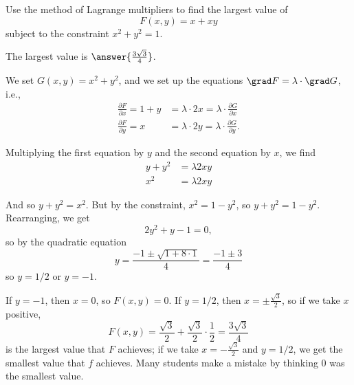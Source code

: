 \documentclass{ximera}
\author{Jim Fowler}
\begin{document}
\begin{exercise}
  Use the method of Lagrange multipliers to find the largest value of 
$$
F(x,y) = x + xy
$$
subject to the constraint $x^2 + y^2 = 1$.

The largest value is $\answer{\frac{3 \sqrt{3}}{4}}$.

\begin{hint}
We set $G(x,y) = x^2 + y^2$, and we set up the equations $\grad F = \lambda \cdot \grad G$, i.e.,
\begin{align*}
\frac{\partial F}{\partial x} = 1 + y &= \lambda \cdot 2x = \lambda \cdot \frac{\partial G}{\partial x}\\
\frac{\partial F}{\partial y} = x &= \lambda \cdot 2y = \lambda \cdot \frac{\partial G}{\partial y
}.
\end{align*}
\end{hint}

\begin{hint}
Multiplying the first equation by $y$ and the second equation by $x$, we find
\begin{align*}
y + y^2 &= \lambda 2xy \\
x^2 &= \lambda 2xy
\end{align*}
\end{hint}

\begin{hint}
And so $y + y^2 = x^2$.  But by the constraint, $x^2 = 1 - y^2$, so $y + y^2 = 1 - y^2$.  Rearranging, we get
$$
2 y^2 + y - 1 = 0,
$$
so by the quadratic equation
$$
y = \frac{-1 \pm \sqrt{1 + 8 \cdot 1}}{4} = \frac{-1 \pm 3}{4}
$$
so $y = 1/2$ or $y = -1$.
\end{hint}

\begin{hint}
If $y = -1$, then $x = 0$, so $F(x,y) = 0$.  If $y = 1/2$, then $x = \pm \frac{\sqrt{3}}{2}$, so if we take $x$ positive,
$$
F(x,y) = \frac{\sqrt{3}}{2} + \frac{\sqrt{3}}{2} \cdot \frac{1}{2} = \frac{3 \sqrt{3}}{4}
$$
is the largest value that $F$ achieves; if we take $x =
-\frac{\sqrt{3}}{2}$ and $y = 1/2$, we get the smallest value that $f$
achieves.  Many students make a mistake by thinking $0$ was the
smallest value.
\end{hint}

\end{exercise}
\end{document}
